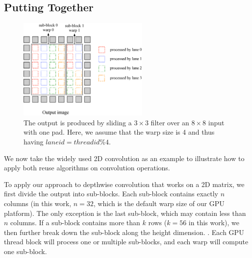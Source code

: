 \subsection{Putting Together}
\label{sec:together}
\begin{figure}
	\centering
	\includegraphics[width=0.8\columnwidth,height=5cm]{figure/overalldesign.eps} 
	\vspace{-3mm}
	\caption{The output is produced by sliding a $3 \times
3$ filter over an $8 \times 8$ input with one pad. Here, we assume
that the warp size is 4 and thus having $laneid=threadid\%4$.} \label{fig:overalldesign}
\end{figure}


We now take the widely used 2D convolution as an example to illustrate how to apply both reuse algorithms
on convolution operations.


To apply our approach to depthwise convolution that works on a 2D matrix, we first divide the output into sub-blocks. Each sub-block
contains exactly $n$ columns (in this work, $n = 32$, which is the default warp size of our GPU platform). The only exception is the last
sub-block, which may contain less than $n$ columns. If a sub-block contains more than $k$ rows ($k=56$ in this work), we then further
break down the sub-block along the height dimension. . Each GPU thread block will process one or multiple sub-blocks, and each warp will
compute one sub-block.


